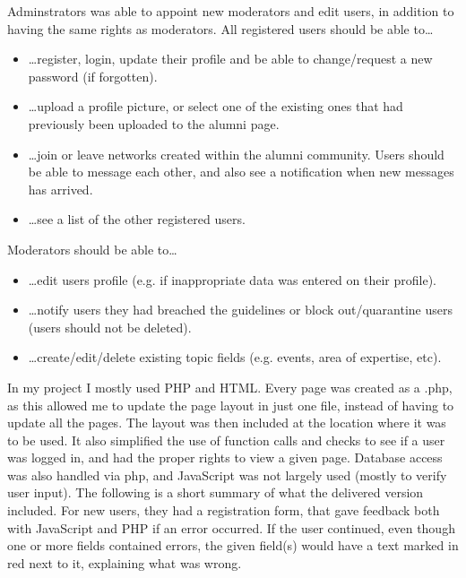 Adminstrators was able to appoint new moderators and edit users, in addition to having the same rights as moderators.
\vspace{0.5em}\newline	
All registered users should be able to\ldots
\begin{itemize}
	\item \ldots register, login, update their profile and be able to change/request a new password (if	forgotten).
	\item \ldots upload a profile picture, or select one of the existing ones that had previously been uploaded to the alumni page.
	\item \ldots join or leave networks created within the alumni community. Users should be able to message each other, and also see a notification when new messages has arrived.
	\item \ldots see a list of the other registered users.
\end{itemize}
\clearpage\noindent
Moderators should be able to\ldots
\begin{itemize}
	\item \ldots edit users profile (e.g. if inappropriate data was entered on their profile).
	\item \ldots notify users they had breached the guidelines or block out/quarantine users (users should not be deleted).
	\item \ldots create/edit/delete existing topic fields (e.g. events, area of expertise, etc).
\end{itemize}
In my project I mostly used PHP and HTML. 
Every page was created as a .php, as this allowed me to update the page layout in just one file, instead of having to update all the pages. 
The layout was then included at the location where it was to be used. 
It also simplified the use of function calls and checks to see if a user was logged in, and had the proper rights to view a given page. 
Database access was also handled via php, and JavaScript was not largely used (mostly to verify user input).
\vspace{0.5em}\newline
The following is a short summary of what the delivered version included. 
For new users, they had a registration form, that gave feedback both with JavaScript and PHP if an error occurred. 
If the user continued, even though one or more fields contained errors, the given field(s) would have a text marked in red next to it, explaining what was wrong. 
